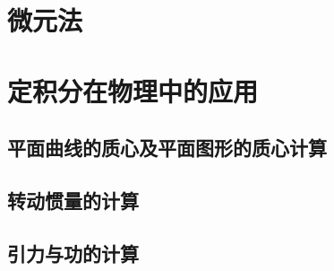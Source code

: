 \section{微元法}

\section{定积分在物理中的应用}
\subsection{平面曲线的质心及平面图形的质心计算}
\subsection{转动惯量的计算}
\subsection{引力与功的计算}
